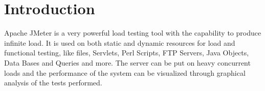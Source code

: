 \documentclass[12pt]{book}
\begin{document}
\listoffigures
\listoftables
\tableofcontents

\pagebreak
\cleardoublepage

\setcounter{page}{1}

\chapter{Introduction}

Apache JMeter is a very powerful load testing tool with the capability to produce infinite load. 
It is used on both static and dynamic resources for load and functional testing, like files, Servlets, Perl Scripts,  
FTP Servers, Java Objects, Data Bases and Queries and more. The server can be put on heavy concurrent loads and the 
performance of the system can be visualized through graphical analysis of the tests performed.
\end{document}
